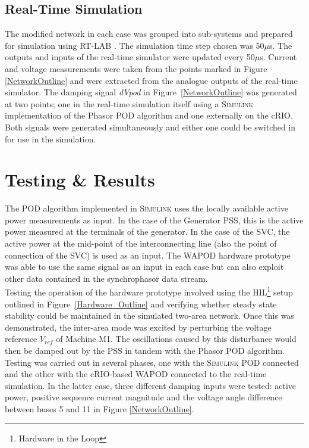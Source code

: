 \documentclass[journal]{IEEEtran}
\begin{document}
\subsection{Real-Time Simulation}
The modified network in each case was grouped into sub-systems and prepared for simulation using RT-LAB \cite{OPALemegasim}. The simulation time step chosen was 50$\mu$s. The outputs and inputs of the real-time simulator were updated every 50$\mu$s. Current and voltage measurements were taken from the points marked in Figure \ref{NetworkOutline} and were extracted from the analogue outputs of the real-time simulator. The damping signal \emph{dVpod} in Figure~\ref{NetworkOutline} was generated at two points; one in the real-time simulation itself using a \textsc{Simulink} implementation of the Phasor POD algorithm and one externally on the cRIO. Both signals were generated simultaneously and either one could be switched in for use in the simulation.

\section{Testing \& Results}\label{Results}

The POD algorithm implemented in \textsc{Simulink} uses the locally available active power measurements as input. In the case of the Generator PSS, this is the active power measured at the terminals of the generator. In the case of the SVC, the active power at the mid-point of the interconnecting line (also the point of connection of the SVC) is used as an input. The WAPOD hardware prototype was able to use the same signal as an input in each case but can also exploit other data contained in the synchrophasor data stream.\\

Testing the operation of the hardware prototype involved using the HIL\footnote{Hardware in the Loop} setup outlined in Figure~\ref{Hardware_Outline} and verifying whether steady state stability could be maintained in the simulated two-area network. Once this was demonstrated, the inter-area mode was excited by perturbing the voltage reference $V_{ref}$ of Machine M1. The oscillations caused by this disturbance would then be damped out by the PSS in tandem with the Phasor POD algorithm. Testing was carried out in several phases, one with the \textsc{Simulink} POD connected and the other with the cRIO-based WAPOD connected to the real-time simulation. In the latter case, three different damping inputs were tested: active power, positive sequence current magnitude and the voltage angle difference between buses 5 and 11 in Figure \ref{NetworkOutline}.
\end{document}
